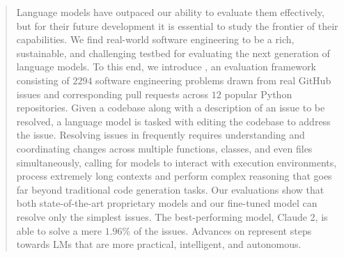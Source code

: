 \begin{abstract}
Language models have outpaced our ability to evaluate them effectively, but for their future development it is essential to study the frontier of their capabilities.
We find real-world software engineering to be a rich, sustainable, and challenging testbed for evaluating the next generation of language models.
To this end, we introduce \benchmark{}, an evaluation framework consisting of $\num{2294}$ software engineering problems drawn from real GitHub issues and corresponding pull requests across $12$ popular Python repositories.
Given a codebase along with a description of an issue to be resolved, a language model is tasked with editing the codebase to address the issue.
Resolving issues in \benchmark{} frequently requires understanding and coordinating changes across multiple functions, classes, and even files simultaneously, calling for models to interact with execution environments, process extremely long contexts and perform complex reasoning that goes far beyond traditional code generation tasks.
Our evaluations show that both state-of-the-art proprietary models and our fine-tuned model \swellama{} can resolve only the simplest issues. The best-performing model, Claude 2, is able to solve a mere $1.96$\% of the issues. 
Advances on \benchmark{} represent steps towards LMs that are more practical, intelligent, and autonomous.
\end{abstract}
